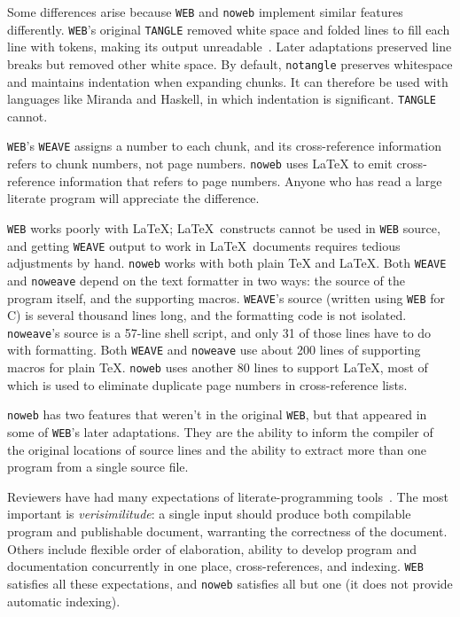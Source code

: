 Some differences arise because {\tt WEB} and \verb+noweb+ implement
similar features differently. 
{\tt WEB}'s  original {\tt TANGLE} removed white space and folded
lines to fill each line with tokens,
making its output unreadable~\cite[Chapter~4, Figure~3]{knuth:literate:book}.
Later adaptations preserved line breaks but removed other white space.
By default, \verb+notangle+ preserves whitespace and maintains
indentation when expanding chunks.
It can therefore be used with
languages like Miranda and
Haskell, in which indentation is significant.
{\tt TANGLE} cannot.

{\tt WEB}'s {\tt WEAVE} assigns a number to each chunk, and its cross-reference
information refers to chunk numbers, not page numbers.
\verb+noweb+ uses {\LaTeX} to emit cross-reference information that
refers to page numbers.
Anyone who has read a large literate program will
appreciate the difference.

{\tt WEB} works poorly with \LaTeX; \LaTeX\ constructs cannot
be used in {\tt WEB} source, and getting {\tt WEAVE} output
to work in \LaTeX\ documents requires tedious adjustments by hand.
\verb+noweb+ works with both plain {\TeX} and {\LaTeX}.
Both {\tt WEAVE} and {\tt noweave} depend on the text formatter in two
ways: the source of the program itself, and the supporting macros.
{\tt WEAVE}'s source (written using {\tt WEB} for C) is
several thousand lines long, and the formatting code is not isolated.
{\tt noweave}'s source is a 57-line shell script, and only 31 of those
lines have to do with formatting.
Both 
{\tt WEAVE} and {\tt noweave} use about 200 lines of supporting macros
for plain {\TeX}.
\verb+noweb+ uses another 80 lines to support {\LaTeX}, most of which
is used to eliminate duplicate page numbers in cross-reference lists.

{\tt noweb} has
two features that weren't in the original {\tt WEB}, but that appeared in
some of {\tt WEB}'s later adaptations.
They are the ability to inform the compiler of the original locations
of source lines and the ability to extract more than one program from
a single source file.

Reviewers have had many expectations of literate-programming
tools~\cite{thimbleby:review,cvw:assessment}.
The most important is {\em verisimilitude}: a single
input should produce both compilable program and publishable document,
warranting the correctness of the document.
Others include flexible order of elaboration,
ability to develop program and documentation concurrently in one
place, cross-references, and indexing.
{\tt WEB} satisfies all these expectations, and {\tt noweb} satisfies
all but one (it does not provide automatic indexing). 

